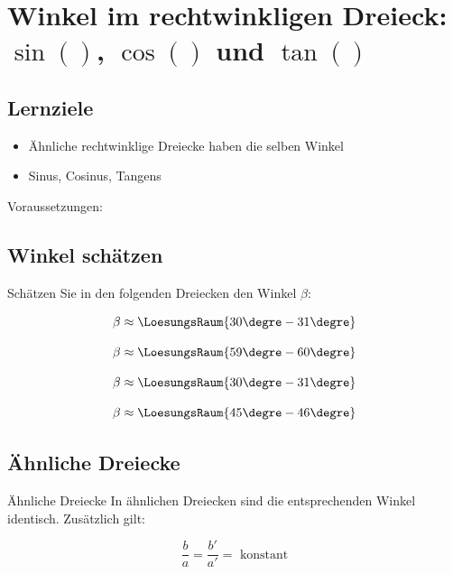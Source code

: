 
\section{Winkel im rechtwinkligen Dreieck: $\sin()$, $\cos()$ und
  $\tan()$}


\subsection*{Lernziele}
\begin{itemize}
 \item Ähnliche rechtwinklige Dreiecke haben die selben Winkel
 \item Sinus, Cosinus, Tangens
\end{itemize}
Voraussetzungen: 

\newpage

\subsection{Winkel schätzen}
Schätzen Sie in den folgenden Dreiecken den Winkel $\beta$:

$$\beta\approx \LoesungsRaum{30\degre - 31\degre}$$

$$\beta\approx \LoesungsRaum{59\degre - 60\degre}$$

$$\beta\approx \LoesungsRaum{30\degre - 31\degre}$$

$$\beta\approx \LoesungsRaum{45\degre - 46\degre}$$

\newpage


\subsection{Ähnliche Dreiecke}
\begin{gesetz}{Ähnliche Dreiecke}{}
In ähnlichen Dreiecken sind die entsprechenden Winkel
identisch. Zusätzlich gilt:

$$\frac{b}{a} = \frac{b'}{a'} = \text{ konstant}$$
\end{gesetz}

